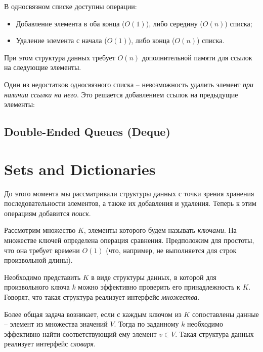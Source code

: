 В односвязном списке доступны операции:
\begin{itemize}
  \item Добавление элемента в оба конца ($O(1)$), либо середину ($O(n)$) списка;
  \item Удаление элемента с начала ($O(1)$), либо конца ($O(n)$) списка.
\end{itemize}

При этом структура данных требует $O(n)$ дополнительной памяти для ссылок на следующие элементы.

Один из недостатков односвязного списка -- невозможность удалить элемент {\em при наличии ссылки на него}. Это решается добавлением ссылок на предыдущие элементы:

\subsection*{Double-Ended Queues (Deque)}




\section{Sets and Dictionaries}

До этого момента мы рассматривали структуры данных с точки зрения хранения последовательности элементов, а также их добавления и удаления. Теперь к этим операциям добавится {\em поиск}.

Рассмотрим множество $K$, элементы которого будем называть {\em ключами}. На множестве ключей определена операция сравнения. Предположим для простоты, что она требует времени $O(1)$ (что, например, не выполняется для строк произвольной длины).

Необходимо представить $K$ в виде структуры данных, в которой для произвольного ключа $k$ можно эффективно проверить его принадлежность к $K$. Говорят, что такая структура реализует интерфейс {\em множества}.

Более общая задача возникает, если с каждым ключом из $K$ сопоставлены данные -- элемент из множества значений $V$.  Тогда по заданному $k$ необходимо эффективно найти соответствующий ему элемент $v \in V$. Такая структура данных реализует интерфейс {\em словаря}.
